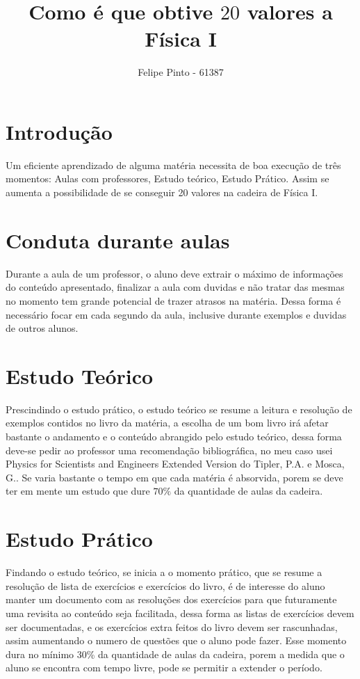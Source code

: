 \documentclass[12pt]{article}
\begin{document}
\title{Como é que obtive $20$ valores a Física I}
\author{Felipe Pinto - 61387}

\maketitle
\tableofcontents
\break

\section{Introdução}
\quad Um eficiente aprendizado de alguma matéria necessita de boa execução de três momentos: Aulas com professores, Estudo teórico, Estudo Prático. Assim se aumenta a possibilidade de se conseguir 20 valores na cadeira de Física I.

\section{Conduta durante aulas}
\quad	Durante a aula de um professor, o aluno deve extrair o máximo de informações do conteúdo apresentado, finalizar a aula com duvidas e não tratar das mesmas no momento tem grande potencial de trazer atrasos na matéria. Dessa forma é necessário focar em cada segundo da aula, inclusive durante exemplos e duvidas de outros alunos.

\section{Estudo Teórico}
\quad	Prescindindo o estudo prático, o estudo teórico se resume a leitura e resolução de exemplos contidos no livro da matéria, a escolha de um bom livro irá afetar bastante o andamento e o conteúdo abrangido pelo estudo teórico, dessa forma deve-se pedir ao professor uma recomendação bibliográfica, no meu caso usei Physics for Scientists and Engineers Extended Version do Tipler, P.A. e Mosca, G.. Se varia bastante o tempo em que cada matéria é absorvida, porem se deve ter em mente um estudo que dure $70\%$ da quantidade de aulas da cadeira.

\section{Estudo Prático}
\quad Findando o estudo teórico, se inicia a o momento prático, que se resume a resolução de lista de exercícios e exercícios do livro, é de interesse do aluno manter um documento com as resoluções dos exercícios para que futuramente uma revisita ao conteúdo seja facilitada, dessa forma as listas de exercícios devem ser documentadas, e os exercícios extra feitos do livro devem ser rascunhadas, assim aumentando o numero de questões que o aluno pode fazer. Esse momento dura no mínimo 30\% da quantidade de aulas da cadeira, porem a medida que o aluno se encontra com tempo livre, pode se permitir a extender o período.
\end{document}
